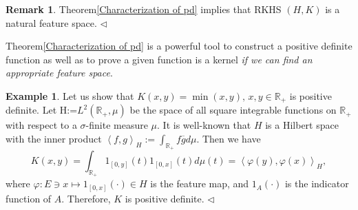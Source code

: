 \documentclass[a4paper,12pt]{article}
\theoremstyle{remark}
\theoremstyle{definition}
\newtheorem{rem}[thm]{Remark}
\theoremstyle{definition}
\newtheorem{ex}[thm]{Example}
\theoremstyle{definition}
\newcommand{\ip}[2]{\left<#1, #2 \right>}
\newcommand{\fin}{\hfill \( \triangleleft \) }
\begin{document}
\begin{rem}
	Theorem\ref{Characterization of pd} implies that RKHS \( (H,K) \) is a natural feature space.
	\fin\end{rem}

Theorem\ref{Characterization of pd} is a powerful tool to construct a positive definite function as well as to prove a given function is a kernel \textit{if we can find an appropriate feature space}.
\begin{ex}
	Let us show that \( K(x,y) = \min(x,y),\,x,y \in \mathbb{R}_{+} \) is positive definite.
	Let H:=\( L^2(\mathbb{R}_{+}, \mu) \) be the space of all square integrable functions on \( \mathbb{R}_{+} \) with respect to a \( \sigma \)-finite measure \( \mu \). It is well-known that \( H \) is a Hilbert space with the inner product \( \ip{f}{g}_H := \int_{\mathbb{R}_{+}} f \overline{g} d \mu\). Then we have
	\begin{equation*}
		K(x,y) = \int_{\mathbb{R}_{+}} 1_{[0,y]}(t) 1_{[0,x]}(t) d \mu(t) = \ip{\varphi(y)}{\varphi(x)}_H,
	\end{equation*}
	where \( \varphi:E \ni x \mapsto 1_{[0,x]}(\cdot ) \in H \) is the feature map, and \( 1_A(\cdot ) \) is the indicator function of \( A \). Therefore, \( K \) is positive definite. \fin
\end{ex}
\end{document}
